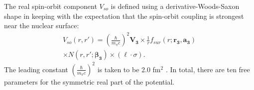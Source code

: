 \documentclass[twocolumn,secnumarabic,amssymb, nobibnotes, aps, prl,
superscriptaddress, nobalancelastpage, floatfix]{revtex4}
\begin{document}
{The real spin-orbit component $V_{so}$ is defined using a derivative-Woods-Saxon
shape in keeping with the expectation that the spin-orbit coupling is strongest near the
nuclear surface:
\begin{equation} \label{RealSOEquation}
    \begin{split}
        V_{so}(r,r') = \left(\frac{\hbar}{m_{\pi}c}\right)^{2}
        \mathbf{V_{3}}\times\frac{1}{r}f_{sur}(r;\mathbf{r_{3}}, \mathbf{a_{3}})\\
        {\times}N(r,r';\boldsymbol{\beta_{3}}) {\times}(\ell\cdot\sigma).
    \end{split}
\end{equation}
The leading constant $\left(\frac{\hbar}{m_{\pi}c}\right)^{2}$ is taken to be 2.0 fm$^{2}$
\cite{MahzoonPhDThesis}. In total, there are ten free parameters for the
symmetric real part of the potential.

}
\end{document}
